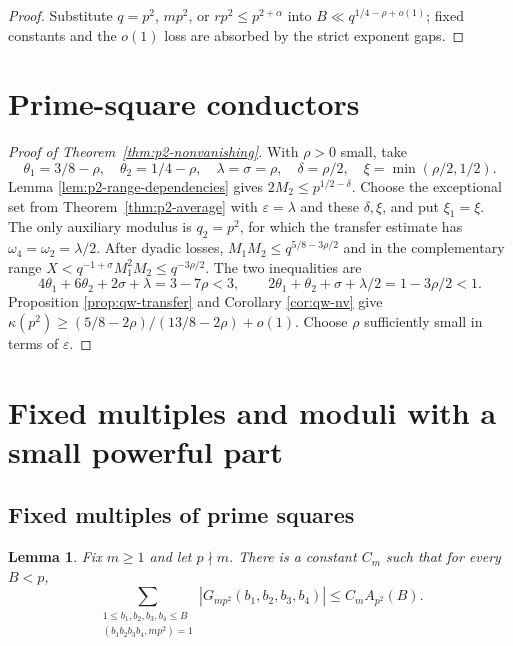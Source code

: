 \documentclass[12pt, a4paper]{amsart}
\numberwithin{equation}{section}
\newcommand{\ep}{\varepsilon}
\renewcommand{\le}{\leqslant}
\renewcommand{\ge}{\geqslant}
\theoremstyle{plain}
\newtheorem{lem}{Lemma}[section]
\begin{document}
\begin{proof}
Substitute $q=p^2$, $mp^2$, or $rp^2\le p^{2+\alpha}$ into $B\ll q^{1/4-\rho+o(1)}$; fixed constants and the $o(1)$ loss are absorbed by the strict exponent gaps.
\end{proof}

\section{Prime-square conductors}\label{sec:p2-nonvanishing}

\begin{proof}[Proof of Theorem~\ref{thm:p2-nonvanishing}]
With $\rho>0$ small, take
$$
\theta_1=3/8-\rho,\quad \theta_2=1/4-\rho,\quad \lambda=\sigma=\rho,\quad \delta=\rho/2,\quad \xi=\min(\rho/2,1/2).
$$
 Lemma \ref{lem:p2-range-dependencies} gives $2M_2\le p^{1/2-\delta}$. Choose the exceptional set from Theorem~\ref{thm:p2-average} with $\ep=\lambda$ and these $\delta,\xi$, and put $\xi_1=\xi$. The only auxiliary modulus is $q_2=p^2$, for which the transfer estimate has $\omega_4=\omega_2=\lambda/2$. After dyadic losses, $M_1M_2\le q^{5/8-3\rho/2}$ and in the complementary range $X<q^{-1+\sigma}M_1^2M_2\le q^{-3\rho/2}$. The two inequalities are
$$
4\theta_1+6\theta_2+2\sigma+\lambda=3-7\rho<3,
\qquad
2\theta_1+\theta_2+\sigma+\lambda/2=1-3\rho/2<1.
$$
Proposition \ref{prop:qw-transfer} and Corollary \ref{cor:qw-nv} give $\kappa(p^2)\ge(5/8-2\rho)/(13/8-2\rho)+o(1)$. Choose $\rho$ sufficiently small in terms of $\ep$.
\end{proof}

\section{Fixed multiples and moduli with a small powerful part}
\label{sec:small-nsf}

\subsection{Fixed multiples of prime squares}

\begin{lem}\label{lem:crt-stability}
 Fix $m\ge1$ and let $p\nmid m$. There is a constant $C_m$ such that for every $B<p$,
$$
\sum_{\substack{1\le b_1,b_2,b_3,b_4\le B\\ (b_1b_2b_3b_4,mp^2)=1}}
|G_{mp^2}(b_1,b_2,b_3,b_4)|
\le C_m A_{p^2}(B).
$$
\end{lem}
\end{document}
